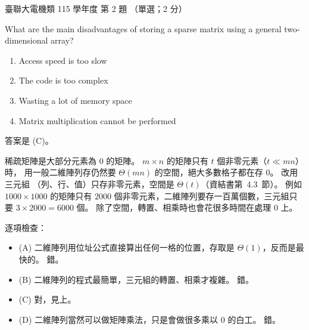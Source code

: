 \begin{pastexam}[label={px:ust-115-ee-ds-02}]{臺聯大電機類 115 學年度 第 2 題}
（單選；2 分）

What are the main disadvantages of storing a sparse matrix using a general two-dimensional array?
\begin{enumerate}[label=(\Alph*)]
\item Access speed is too slow
\item The code is too complex
\item Wasting a lot of memory space
\item Matrix multiplication cannot be performed
\end{enumerate}
\end{pastexam}

\begin{pastsoln}
答案是 (C)。

稀疏矩陣是大部分元素為 $0$ 的矩陣。 $m \times n$ 的矩陣只有 $t$ 個非零元素（$t \ll mn$）時，
用一般二維陣列存仍然要 $\Theta(mn)$ 的空間，絕大多數格子都在存 $0$。 改用三元組
（列、行、值）只存非零元素，空間是 $\Theta(t)$（資結書第~4.3~節）。 例如 $1000 \times 1000$
的矩陣只有 $2000$ 個非零元素，二維陣列要存一百萬個數，三元組只要 $3 \times 2000 = 6000$ 個。
除了空間，轉置、相乘時也會花很多時間在處理 $0$ 上。

逐項檢查：
\begin{itemize}
\item (A) 二維陣列用位址公式直接算出任何一格的位置，存取是 $\Theta(1)$，反而是最快的。 錯。
\item (B) 二維陣列的程式最簡單，三元組的轉置、相乘才複雜。 錯。
\item (C) 對，見上。
\item (D) 二維陣列當然可以做矩陣乘法，只是會做很多乘以 $0$ 的白工。 錯。
\end{itemize}
\end{pastsoln}
